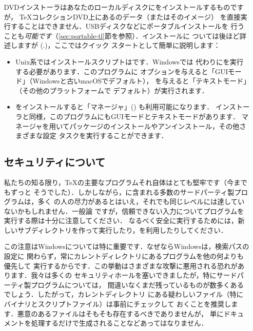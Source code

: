 \documentclass[uplatex,dvipdfmx,tombow]{jsarticle}
\begin{document}
DVDインストーラはあなたのローカルディスクに\TL をインストールするものですが，
\TeX コレクションDVD上にある\TL のデータ（またはそのイメージ）
を直接実行することはできません．USBディスクなどにポータブルインストールを
行うことも\emph{可能です}（\ref{sec:portable-tl}節を参照）．インストールに
ついては後ほど詳述しますが (\p.\pageref{sec:install})，ここではクイック
スタートとして簡単に説明します：

\begin{itemize}
\item Unix系ではインストールスクリプトはです．Windowsでは
代わりにを実行する必要があります．このプログラムに
オプションを与えると「GUIモード」（Windowsと古いmacOSでデフォルト），
を与えると「テキストモード」（その他のプラットフォームで
デフォルト）が実行されます．

\item \TL をインストールすると「\TL マネージャ」() も利用可能になります．
インストーラと同様，このプログラムにもGUIモードとテキストモードがあります．\TL
マネージャを用いてパッケージのインストールやアンインストール，その他さまざまな設定
タスクを実行することができます．
\end{itemize}

\subsection{セキュリティについて}
\label{sec:security}

私たちの知る限り，\TeX の主要なプログラムそれ自体はとても堅牢です（今までもずっと
そうでした）．しかしながら，\TL に含まれる多数のサードパーティ製プログラムは，多く
の人の尽力があるとはいえ，それでも同じレベルには達していないかもしれません．一般論
ですが，信頼できない入力についてプログラムを実行する際は十分に注意してください．
なるべく安全に実行するためには，新しいサブディレクトリを作って実行したり，を利用したりしてください．

この注意はWindowsについては特に重要です．なぜならWindowsは，検索パスの設定に
関わらず，常にカレントディレクトリにあるプログラムを他の何よりも優先して
実行するからです．この挙動はさまざまな攻撃に悪用される恐れがあります．我々は多くの
セキュリティホールを塞いできましたが，特にサードパーティ製プログラムについては，
間違いなくまだ残っているものが数多くあるでしょう．したがって，カレントディレクトリ
にある疑わしいファイル（特にバイナリとスクリプトファイル）は事前にチェックして
おくことを推奨します．悪意のあるファイルはそもそも存在するべきでありませんが，
単にドキュメントを処理するだけで生成されることなどあってはなりません．
\end{document}
